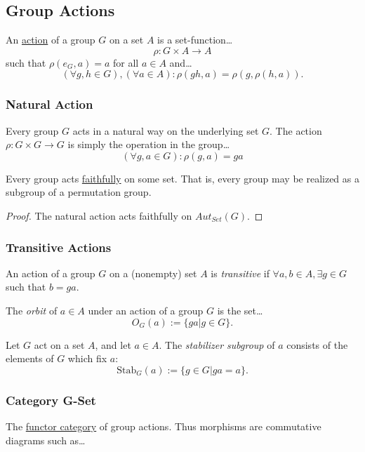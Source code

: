 \subsection{Group Actions}\label{groupactions}

An \hyperref[categoricalgroupaction]{action} of a group $G$ on a set $A$ is a set-function\dots
$$\rho : G \times A \rightarrow A$$
such that $\rho (e_G, a) = a$ for all $a \in A$ and\dots
$$(\forall g,h \in G), (\forall a \in A) : \rho(gh,a) = \rho(g, \rho(h,a)).$$

\subsubsection{Natural Action}\label{naturalgroupaction}
Every group $G$ acts in a natural way on the underlying set $G$. The action $\rho : G \times G \rightarrow G$ is simply
the operation in the group\dots
$$(\forall g,a \in G): \rho(g,a) = ga$$

\begin{theorem}
\label{cayleystheorem}
Every group acts \hyperref[faithful]{faithfully} on some set. That is, every group may be realized as a subgroup of a permutation group.
\end{theorem}

\begin{proof}
The natural action acts faithfully on $Aut_{Set}(G)$.
\end{proof}

\subsubsection{Transitive Actions}\label{transitiveactions}
An action of a group $G$ on a (nonempty) set $A$ is \emph{transitive} if $\forall a,b \in A, \exists g \in G$ such that $b = ga$.

\label{orbit}
The \emph{orbit} of $a \in A$ under an action of a group $G$ is the set\dots
$$O_G(a) := \{ ga | g \in G \}.$$

\label{stabilizer}
Let $G$ act on a set $A$, and let $a \in A$. The \emph{stabilizer subgroup} of $a$ consists of the elements of $G$ which fix $a$:
$$\textrm{Stab}_G(a) := \{ g \in G | ga = a \}.$$

\subsubsection{Category G-Set}\label{gsetcategory}
The \hyperref[functorcategories]{functor category} of group actions. Thus morphisms are commutative diagrams such as\dots

